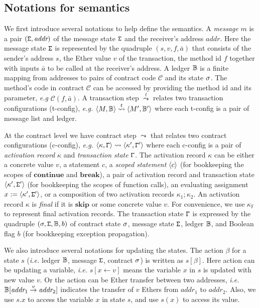 \subsection{Notations for semantics}

We first introduce several notations to help define the semantics.  A \emph{message} $m$ is a pair $(\mathtt{\Sigma},\textit{addr})$ of the message state $\mathtt{\Sigma}$ and the receiver's address $\textit{addr}$. Here the message state $\mathtt{\Sigma}$ is represented by the quadruple $(s,v,f,\bar{a})$ that consists of the sender's address $s$, the Ether value $v$ of the transaction, the method id $f$ together with inputs $\bar{a}$ to be called at the receiver's address. A ledger $\mathbb{B}$ is a finite mapping from addresses to pairs of contract code $\mathcal{C}$ and its state $\sigma$. The method's code in contract $\mathcal{C}$ can be accessed by providing the method id and its parameter, \emph{e.g} $\mathcal{C}(f,\bar{a})$. A transaction step $\stackrel{t}{\leadsto}$ relates two transaction configurations (t-config), \emph{e.g.} $\langle M,\mathbb{B} \rangle \stackrel{t}{\leadsto} \langle M',\mathbb{B}' \rangle$ where each t-config is a pair of message list and ledger. 

At the contract level we have contract step $\leadsto$ that relates two contract configurations (c-config), \emph{e.g.} $\langle \kappa,\mathtt{\Gamma} \rangle \leadsto \langle \kappa',\mathtt{\Gamma}' \rangle$ where each c-config is a pair of \emph{activation record} $\kappa$ and \emph{transaction state} $\mathtt{\Gamma}$. The activation record $\kappa$ can be either a concrete value $v$, a statement $c$, a \emph{scoped statement} $\langle c \rangle$ (for bookkeeping the scopes of $\textbf{continue}$ and $\textbf{break}$), a pair of activation record and transaction state $\langle \kappa',\mathtt{\Sigma}' \rangle$ (for bookkeeping the scopes of function calls), an evaluating assignment $x:= \langle \kappa',\mathtt{\Sigma}' \rangle$, or a composition of two activation records $\kappa_1;\kappa_2$. An activation record $\kappa$ is \emph{final} if it is $\textbf{skip}$ or some concrete value $v$. For convenience, we use $\kappa_{\mathbb{F}}$ to represent final activation records. The transaction state $\mathtt{\Gamma}$ is expressed by the quadruple $(\sigma,\mathtt{\Sigma},\mathbb{B},b)$ of contract state $\sigma$, message state $\mathtt{\Sigma}$, ledger $\mathbb{B}$, and Boolean flag $b$ (for bookkeeping exception propagation).


We also introduce several notations for updating the states. The action $\beta$ for a state $s$ (\emph{i.e.} ledger $\mathbb{B}$, message $\mathtt{\Sigma}$, contract $\sigma$) is written as $s[\beta]$. Here action can be updating a variable, \emph{i.e.} $s[x \leftarrow v]$ means the variable $x$ in $s$ is updated with new value $v$. Or the action can be Ether transfer between two addresses, \emph{i.e.} $\mathbb{B}[\textit{addr}_1 \stackrel{v}{\rightarrow} \textit{addr}_2]$ indicates the transfer of $v$ Ethers from $\textit{addr}_1$ to $\textit{addr}_2$. Also, we use $s.x$ to access the variable $x$ in state $s$, and use $s(x)$ to access its value.

